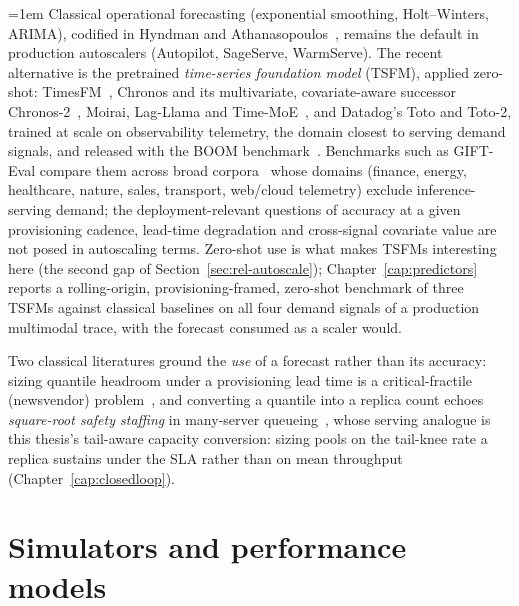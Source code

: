{\emergencystretch=1em
Classical operational forecasting (exponential smoothing,
Holt--Winters, ARIMA), codified in Hyndman and
Athanasopoulos~\cite{Hyndman2021fpp3}, remains the default in production
autoscalers (Autopilot, SageServe, WarmServe). The recent alternative is
the pretrained \emph{time-series foundation model} (TSFM), applied
zero-shot: TimesFM~\cite{Das2024TimesFM}, Chronos and its multivariate,
covariate-aware successor
Chronos-2~\cite{Ansari2024Chronos,Ansari2025Chronos2}, Moirai, Lag-Llama
and Time-MoE~\cite{Woo2024Moirai,Rasul2023LagLlama,Shi2025TimeMoE}, and
Datadog's Toto and Toto-2, trained at scale on observability telemetry,
the domain closest to serving demand signals, and released with
the BOOM benchmark~\cite{Cohen2024Toto,Cohen2025BOOM,Khwaja2026Toto2}.
Benchmarks such as GIFT-Eval compare them across broad
corpora~\cite{Aksu2024GIFTEval} whose domains (finance, energy,
healthcare, nature, sales, transport, web/cloud telemetry) exclude
inference-serving demand; the deployment-relevant questions of accuracy
at a given provisioning cadence, lead-time degradation and cross-signal
covariate value are not posed in autoscaling terms.
Zero-shot use is what makes TSFMs interesting here (the second gap of
Section~\ref{sec:rel-autoscale}); Chapter~\ref{cap:predictors} reports
a rolling-origin, provisioning-framed, zero-shot benchmark of
three TSFMs against classical baselines on all four demand signals of a
production multimodal trace, with the forecast consumed as a scaler would.\par}

Two classical literatures ground the \emph{use} of a forecast rather
than its accuracy: sizing quantile headroom under a provisioning lead
time is a critical-fractile (newsvendor)
problem~\cite{Arrow1951Newsvendor}, and converting a quantile into a
replica count echoes \emph{square-root safety staffing} in many-server
queueing~\cite{HalfinWhitt1981,Borst2004Dimensioning,Gross2018QueueingFundamentals},
whose serving analogue is this thesis's tail-aware capacity
conversion: sizing pools on the tail-knee rate a replica sustains under
the SLA rather than on mean throughput (Chapter~\ref{cap:closedloop}).

\section{Simulators and performance models}
\label{sec:rel-sim}

